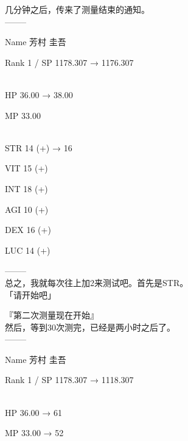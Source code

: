 几分钟之后，传来了测量结束的通知。\\

  --------

  Name 芳村 圭吾

  Rank 1 / SP 1178.307 → 1176.307

%  
\\

  HP  36.00 → 38.00

  MP  33.00

%  
\\

  STR 14 (+) → 16

  VIT 15 (+)

  INT 18 (+)

  AGI 10 (+)

  DEX 16 (+)

  LUC 14 (+)

  --------\\

总之，我就每次往上加2来测试吧。首先是STR。\\

「请开始吧」

『第二次测量现在开始』\\

然后，等到30次测完，已经是两小时之后了。\\

  --------

  Name 芳村 圭吾

  Rank 1 / SP 1178.307 → 1118.307

%  
\\

  HP  36.00 → 61

  MP  33.00 → 52

%  
\\

